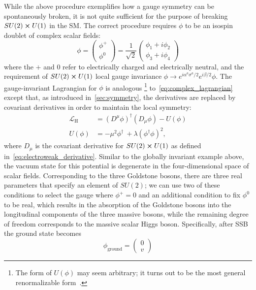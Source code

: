 While the above procedure exemplifies how a gauge symmetry can be spontaneously
broken, it is not quite sufficient for the purpose of breaking $SU(2) \cross
U(1)$ in the SM. The correct procedure requires $\phi$ to be an isospin doublet
of complex scalar fields:
\begin{equation}
  \phi = \left(
    \begin{array}{c}
      \phi^+ \\
      \phi^0
    \end{array}
  \right) = \frac{1}{\sqrt{2}} \left(
    \begin{array}{c}
      \phi_1+i\phi_2 \\
      \phi_3+i\phi_4
    \end{array}
  \right)
\end{equation}
where the $+$ and $0$ refer to electrically charged and electrically neutral,
and the requirement of $SU(2) \cross U(1)$ local gauge invariance $\phi
\rightarrow e^{i\alpha^a\sigma^a/2}e^{i\beta/2}\phi$. The gauge-invariant
Lagrangian for $\phi$ is analogous \footnote{The form of $U(\phi)$ may seem
arbitrary; it turns out to be the most general renormalizable
form~\cite{cottingham1998introduction}.} to~\cref{eq:complex_lagrangian} except
that, as introduced in~\cref{sec:symmetry}, the derivatives are replaced by
covariant derivatives in order to maintain the local symmetry:
\begin{align}
  \mathcal{L}_\text{H} &= (D^\mu\phi)^\dagger(D_\mu\phi)
    - U(\phi) \label{higgs_lagrangian} \\
  U(\phi) &=
    - \mu^2\phi^\dagger\
    + \lambda(\phi^\dagger\phi)^2,
\end{align}
where $D_\mu$ is the covariant derivative for $SU(2) \cross U(1)$ as defined in~\cref{eq:electroweak_derivative}. Similar to the globally invariant example above, the vacuum state for this potential is degenerate in the four-dimensional space of scalar fields. Corresponding to the three Goldstone bosons, there are three real parameters that specify an element of $SU(2)$; we can use two of these conditions to select the gauge where $\phi^+=0$ and an additional condition to fix $\phi^0$ to be real, which results in the absorption of the Goldstone bosons into the longitudinal components of the three massive bosons, while the remaining degree of freedom corresponds to the massive scalar Higgs boson. Specifically, after SSB the ground state becomes
\begin{equation}
  \phi_\text{ground} = \left(
    \begin{array}{c}
      0 \\
      v
    \end{array}
  \right)
\end{equation}

